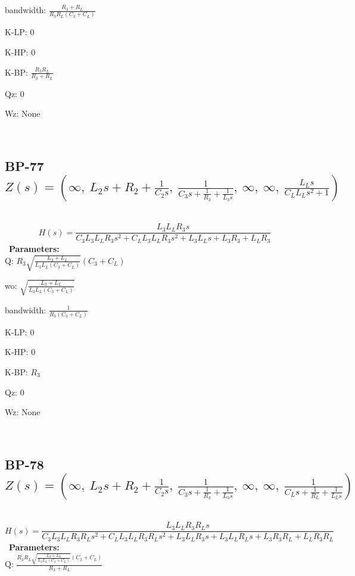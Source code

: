 \documentclass{article}
\begin{document}
bandwidth: $\frac{R_{3} + R_{L}}{R_{3} R_{L} \left(C_{3} + C_{L}\right)}$\ 

K-LP: $0$\ 

K-HP: $0$\ 

K-BP: $\frac{R_{3} R_{L}}{R_{3} + R_{L}}$\ 

Qz: $0$\ 

Wz: $\text{None}$\ 

\ 

\subsection{BP-77 $Z(s) = \left( \infty, \  L_{2} s + R_{2} + \frac{1}{C_{2} s}, \  \frac{1}{C_{3} s + \frac{1}{R_{3}} + \frac{1}{L_{3} s}}, \  \infty, \  \infty, \  \frac{L_{L} s}{C_{L} L_{L} s^{2} + 1}\right)$ } \ 
\textbf{\[H(s) = \frac{L_{3} L_{L} R_{3} s}{C_{3} L_{3} L_{L} R_{3} s^{2} + C_{L} L_{3} L_{L} R_{3} s^{2} + L_{3} L_{L} s + L_{3} R_{3} + L_{L} R_{3}}\] } \ 
\textbf{Parameters:}\\ 

Q: $R_{3} \sqrt{\frac{L_{3} + L_{L}}{L_{3} L_{L} \left(C_{3} + C_{L}\right)}} \left(C_{3} + C_{L}\right)$\ 

wo: $\sqrt{\frac{L_{3} + L_{L}}{L_{3} L_{L} \left(C_{3} + C_{L}\right)}}$\ 

bandwidth: $\frac{1}{R_{3} \left(C_{3} + C_{L}\right)}$\ 

K-LP: $0$\ 

K-HP: $0$\ 

K-BP: $R_{3}$\ 

Qz: $0$\ 

Wz: $\text{None}$\ 

\ 

\subsection{BP-78 $Z(s) = \left( \infty, \  L_{2} s + R_{2} + \frac{1}{C_{2} s}, \  \frac{1}{C_{3} s + \frac{1}{R_{3}} + \frac{1}{L_{3} s}}, \  \infty, \  \infty, \  \frac{1}{C_{L} s + \frac{1}{R_{L}} + \frac{1}{L_{L} s}}\right)$ } \ 
\textbf{\[H(s) = \frac{L_{3} L_{L} R_{3} R_{L} s}{C_{3} L_{3} L_{L} R_{3} R_{L} s^{2} + C_{L} L_{3} L_{L} R_{3} R_{L} s^{2} + L_{3} L_{L} R_{3} s + L_{3} L_{L} R_{L} s + L_{3} R_{3} R_{L} + L_{L} R_{3} R_{L}}\] } \ 
\textbf{Parameters:}\\ 

Q: $\frac{R_{3} R_{L} \sqrt{\frac{L_{3} + L_{L}}{L_{3} L_{L} \left(C_{3} + C_{L}\right)}} \left(C_{3} + C_{L}\right)}{R_{3} + R_{L}}$\ 
\end{document}
